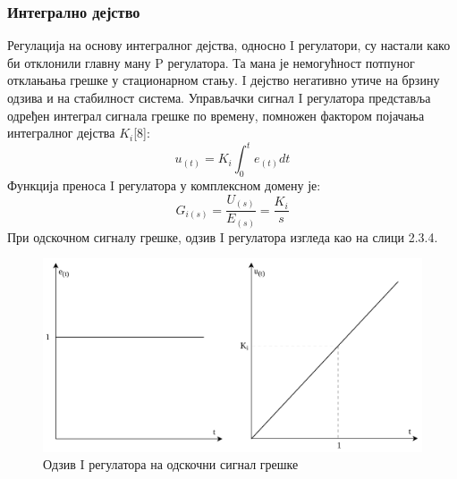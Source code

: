 \documentclass[12pt]{article}
\begin{document}
\subsubsection{Интегрално дејство}
Регулација на основу интегралног дејства, односно I регулатори, су настали како би отклонили главну ману P регулатора. Та мана је немогућност потпуног отклањања грешке у стационарном стању. I дејство негативно утиче на брзину одзива и на стабилност система. Управљачки сигнал I регулатора представља одређен интеграл сигнала грешке по времену, помножен фактором појачања интегралног дејства $K_i$[8]:
\begin{equation}
    u_{(t)} = K_i\int_{0}^{t}e_{(t)}dt
\end{equation}
Функција преноса I регулатора у комплексном домену је:
\begin{equation}
    G_{i(s)} = \dfrac{U_{(s)}}{E_{(s)}} = \dfrac{K_i}{s}
\end{equation}
При одскочном сигналу грешке, одзив I регулатора изгледа као на слици 2.3.4.
\begin{figure}[H]
    \centering
    \includegraphics[width=13cm]{figures/i.drawio.png}
    \caption{Одзив I регулатора на одскочни сигнал грешке}
    \label{fig:I_одзив}
\end{figure}
\end{document}
